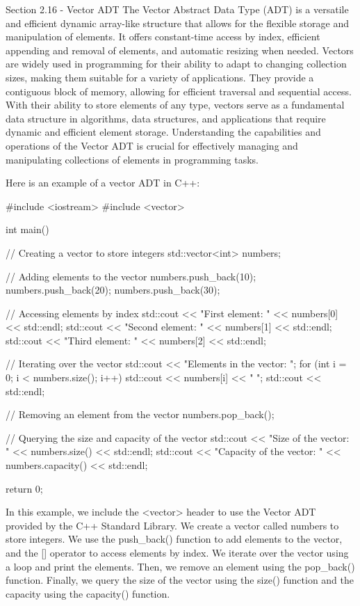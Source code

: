 \begin{notes}{Section 2.16 - Vector ADT}
    The Vector Abstract Data Type (ADT) is a versatile and efficient dynamic array-like structure that allows for the flexible storage and manipulation of elements. It offers constant-time access by index, efficient appending and removal of elements, and automatic resizing when needed. Vectors are widely used in programming for 
    their ability to adapt to changing collection sizes, making them suitable for a variety of applications. They provide a contiguous block of memory, allowing for efficient traversal and sequential access. With their ability to store elements of any type, vectors serve as a fundamental data structure in algorithms, data structures, 
    and applications that require dynamic and efficient element storage. Understanding the capabilities and operations of the Vector ADT is crucial for effectively managing and manipulating collections of elements in programming tasks.
    
    \begin{highlight}
        Here is an example of a vector ADT in C++:
    \begin{code}[C++]
    #include <iostream>
    #include <vector>
    
    int main() {
        // Creating a vector to store integers
        std::vector<int> numbers;
    
        // Adding elements to the vector
        numbers.push_back(10);
        numbers.push_back(20);
        numbers.push_back(30);
    
        // Accessing elements by index
        std::cout << "First element: " << numbers[0] << std::endl;
        std::cout << "Second element: " << numbers[1] << std::endl;
        std::cout << "Third element: " << numbers[2] << std::endl;
    
        // Iterating over the vector
        std::cout << "Elements in the vector: ";
        for (int i = 0; i < numbers.size(); i++) {
            std::cout << numbers[i] << " ";
        }
        std::cout << std::endl;
    
        // Removing an element from the vector
        numbers.pop_back();
    
        // Querying the size and capacity of the vector
        std::cout << "Size of the vector: " << numbers.size() << std::endl;
        std::cout << "Capacity of the vector: " << numbers.capacity() << std::endl;
    
        return 0;
    }
    \end{code}
        In this example, we include the <vector> header to use the Vector ADT provided by the C++ Standard Library. We create a vector called numbers to store integers. We use the push\_back() function to add elements to the vector, and the [] operator to access elements by index. We iterate over the vector using a loop and print the 
        elements. Then, we remove an element using the pop\_back() function. Finally, we query the size of the vector using the size() function and the capacity using the capacity() function.
    

\end{highlight}
\end{notes}
